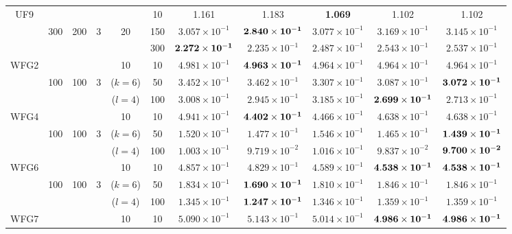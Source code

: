 \documentclass[../main/main]{subfiles}
\begin{document}
\begin{table}[htbp]
\begin{tabular}{c|ccccc|c|c|c|c|c}
\hline
\multirow{3}{*}{UF9} &        &    &&        & 10 & 1.161 & 1.183 & \bf{1.069} & 1.102 & 1.102\\
  				   &300 & 200 & 3 & 20 & 150 & $3.057 \times 10^{-1}$ & $\bf{2.840 \times 10^{-1}}$ & $3.077 \times 10^{-1}$ & $3.169 \times 10^{-1}$ & $3.145 \times 10^{-1}$\\
				   &        &     &&   &300 & $\bf{2.272 \times 10^{-1}}$ &  $2.235 \times 10^{-1}$ & $2.487 \times 10^{-1}$ & $2.543 \times 10^{-1}$ & $2.537 \times 10^{-1}$\\
\hline
\multirow{3}{*}{WFG2} &      &&  &   10    & 10 & $4.981 \times 10^{-1}$ & $\bf{4.963 \times 10^{-1}}$ & $4.964 \times 10^{-1}$ & $4.964 \times 10^{-1}$ & $4.964 \times 10^{-1}$\\
  				   &100 & 100 & 3 & ($k = 6$) & 50 & $3.452 \times 10^{-1}$ & $3.462 \times 10^{-1}$ & $3.307 \times 10^{-1}$ & $3.087 \times 10^{-1}$ & $\bf{3.072 \times 10 ^{-1}}$\\
				   &        &   &&  ($l=4$)   &100 & $3.008 \times 10^{-1}$ & $2.945 \times 10^{-1}$ & $3.185 \times 10^{-1}$ & $\bf{2.699 \times 10^{-1}}$ & $2.713 \times 10 ^{-1}$\\
\hline
\multirow{3}{*}{WFG4} &      &&  &   10    & 10 &$4.941 \times 10^{-1}$ & $\bf{4.402 \times 10^{-1}}$ & $4.466 \times 10^{-1}$ & $4.638 \times 10^{-1}$ & $4.638 \times 10^{-1}$\\
  				   &100 & 100 & 3 & ($k=6$) & 50 & $1.520 \times 10^{-1}$ & $1.477 \times 10^{-1}$ & $1.546 \times 10^{-1}$ & $1.465 \times 10^{-1}$ & $\bf{1.439 \times 10 ^{-1}}$\\
				   &        &&&  ($l=4$)      &100 & $1.003 \times 10^{-1}$ & $9.719 \times 10^{-2}$ & $1.016 \times 10^{-1}$ & $9.837 \times 10^{-2}$ & $\bf{9.700 \times 10 ^{-2}}$\\
\hline
\multirow{3}{*}{WFG6} &       && &   10    & 10 & $4.857 \times 10^{-1}$ & $4.829 \times 10^{-1}$ & $4.589 \times 10^{-1}$ & $\bf{4.538 \times 10^{-1}}$ & $\bf{4.538 \times 10 ^{-1}}$\\
  				   &100 & 100 & 3 & ($k=6$) & 50  & $1.834 \times 10^{-1}$ & $\bf{1.690 \times 10^{-1}}$ & $1.810 \times 10^{-1}$ & $1.846 \times 10^{-1}$ & $1.846 \times 10^{-1}$\\
				   &        &  &&  ($l=4$)    &100  & $1.345 \times 10^{-1}$ & $\bf{1.247 \times 10^{-1}}$ & $1.346 \times 10^{-1}$ & $1.359 \times 10^{-1}$ & $1.359 \times 10^{-1}$\\
\hline
\multirow{3}{*}{WFG7} &       && &  10     & 10 & $5.090 \times 10^{-1}$ & $5.143 \times 10^{-1}$ & $5.014 \times 10^{-1}$ & $\bf{4.986 \times 10^{-1}}$ & $\bf{4.986 \times 10 ^{-1}}$\\

\end{tabular}
\end{table}
\end{document}
